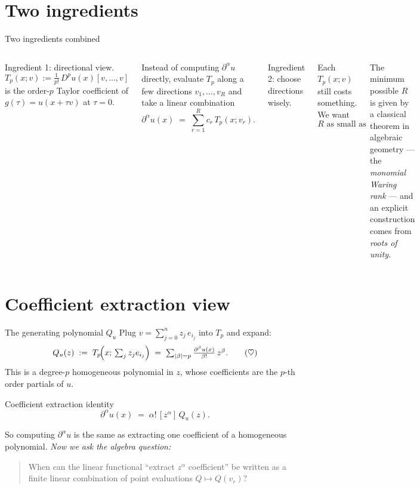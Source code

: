 \documentclass[10pt,aspectratio=169]{beamer}
\newcommand{\Tp}{T_p}
\newcommand{\dal}{\partial^\alpha}
\newcommand{\Qu}{Q_u}
\newcommand{\heart}{\mathrel{\heartsuit}}
\begin{document}
\section{Two ingredients}

\begin{frame}{Two ingredients combined}
  \begin{columns}[T,onlytextwidth]
    \alert{Ingredient 1: directional view.}
    \[
      \Tp(x;v) := \tfrac{1}{p!}\,D^p u(x)[v,\dots,v]
    \]
    is the order-$p$ Taylor coefficient of $g(\tau)=u(x+\tau v)$ at $\tau=0$.

    \medskip
    Instead of computing $\dal u$ directly, evaluate $\Tp$ along a few
    directions $v_1,\dots,v_R$ and take a linear combination
    \[
      \dal u(x) \;=\; \sum_{r=1}^R c_r\,\Tp(x;v_r).
    \]

    \alert{Ingredient 2: choose directions wisely.}

    Each $\Tp(x;v)$ still costs something. We want
    \[
      R \text{ as small as possible.}
    \]

    \pause
    \medskip
    The minimum possible $R$ is given by a classical theorem in algebraic
    geometry --- the \emph{monomial Waring rank} ---
    and an explicit construction comes from \emph{roots of unity}.
  \end{columns}
\end{frame}

\section{Coefficient extraction view}

\begin{frame}{The generating polynomial $\Qu$}
  Plug $v=\sum_{j=0}^{n}z_j\,e_{i_j}$ into $\Tp$ and expand:
  \[
    \Qu(z) \;:=\; \Tp\!\Big(x;\,\textstyle\sum_j z_j e_{i_j}\Big)
           \;=\; \sum_{|\beta|=p}\frac{\partial^\beta u(x)}{\beta!}\,z^\beta. \tag{$\heart$}
  \]
  This is a degree-$p$ homogeneous polynomial in $z$, whose coefficients are
  the $p$-th order partials of $u$.

  \pause
  \medskip
  \begin{block}{Coefficient extraction identity}
    \[
      \boxed{\;\dal u(x) \;=\; \alpha!\,[z^\alpha]\,\Qu(z).\;}
    \]
  \end{block}

  \pause
  \medskip
  So computing $\dal u$ is the same as extracting one coefficient of a
  homogeneous polynomial. \emph{Now we ask the algebra question:}
  \begin{quote}
    \alert{When can the linear functional ``extract $z^\alpha$ coefficient''
    be written as a finite linear combination of point evaluations
    $Q\mapsto Q(v_r)$?}
  \end{quote}
\end{frame}
\end{document}
